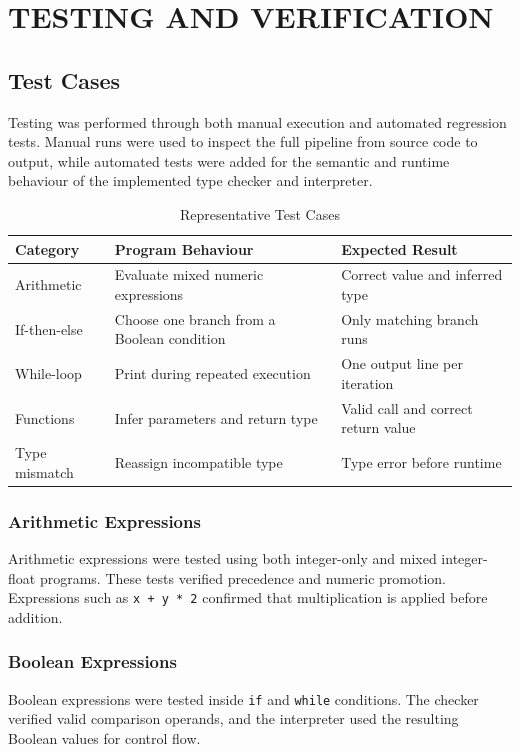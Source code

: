 \chapter{TESTING AND VERIFICATION}

\section{Test Cases}
Testing was performed through both manual execution and automated regression
tests. Manual runs were used to inspect the full pipeline from source code to
output, while automated tests were added for the semantic and runtime behaviour
of the implemented type checker and interpreter.

\begin{table}[H]
\centering
\caption{Representative Test Cases}
\begin{tabular}{p{3.5cm}p{5cm}p{4cm}}
\toprule
Category & Program Behaviour & Expected Result \\
\midrule
Arithmetic & Evaluate mixed numeric expressions & Correct value and inferred type \\
If-then-else & Choose one branch from a Boolean condition & Only matching branch runs \\
While-loop & Print during repeated execution & One output line per iteration \\
Functions & Infer parameters and return type & Valid call and correct return value \\
Type mismatch & Reassign incompatible type & Type error before runtime \\
\bottomrule
\end{tabular}
\end{table}

\subsection{Arithmetic Expressions}
Arithmetic expressions were tested using both integer-only and mixed
integer-float programs. These tests verified precedence and numeric promotion.
Expressions such as \texttt{x + y * 2} confirmed that multiplication is applied
before addition.

\subsection{Boolean Expressions}
Boolean expressions were tested inside \texttt{if} and \texttt{while}
conditions. The checker verified valid comparison operands, and the interpreter
used the resulting Boolean values for control flow.

